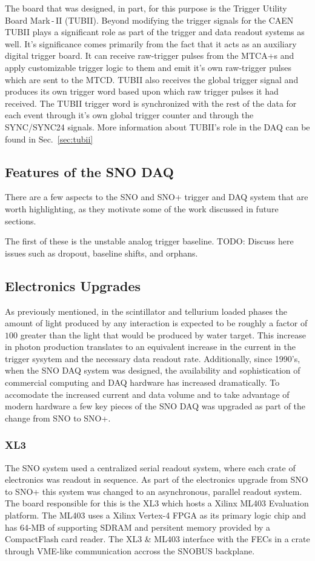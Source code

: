 The board that was designed, in part, for this purpose is the Trigger Utility
Board Mark\,-\,II (TUBII).
Beyond modifying the trigger signals for the CAEN TUBII plays a significant
role as part of the trigger and data readout systems as well.
It's significance comes primarily from the fact that it acts as an auxiliary
digital trigger board. It can receive raw-trigger pulses from the MTCA+s and apply
customizable trigger logic to them and emit it's own raw-trigger pulses which are
sent to the MTCD.
TUBII also receives the global trigger signal and produces its own trigger
word based upon which raw trigger pulses it had received. The TUBII trigger
word is synchronized with the rest of the data for each event through it's own
global trigger counter and through the SYNC/SYNC24 signals. More information about
TUBII's role in the DAQ can be found in Sec.~\ref{sec:tubii}

\subsection{Features of the SNO DAQ}
There are a few aspects to the SNO and SNO+ trigger and DAQ system that 
are worth highlighting, as they motivate some of the work discussed in future
sections.%

The first of these is the unstable analog trigger baseline.
TODO\@: Discuss here issues such as dropout, baseline shifts,
and orphans.
\subsection{Electronics Upgrades}
As previously mentioned, in the scintillator and tellurium loaded phases the
amount of light produced by any interaction is expected to be roughly a factor
of $100$ greater than the light that would be produced by water target.
This increase in photon production translates to an equivalent increase in the
current in the trigger sysytem and the necessary data readout rate.
Additionally, since 1990's, when the SNO DAQ system was designed, the availability
and sophistication of commercial computing and DAQ hardware has increased
dramatically.
To accomodate the increased current and data volume and to take advantage of modern
hardware a few key pieces of the SNO DAQ was upgraded as part of the change from
SNO to SNO+.
\label{sec:upgrades}
\subsubsection{XL3}
\label{sec:xl3}
The SNO system used a centralized serial readout system, where each crate of
electronics was readout in sequence.
As part of the electronics upgrade from SNO to SNO+ this system was changed to
an asynchronous, parallel readout system.
The board responsible for this is the XL3 which hosts a Xilinx ML403
Evaluation platform.
The ML403 uses a Xilinx Vertex-4 FPGA as its primary logic chip and has
64-MB of supporting SDRAM and persitent memory provided by a CompactFlash
card reader.
The XL3 \& ML403 interface with the FECs in a crate through VME-like communication
accross the SNOBUS backplane.

